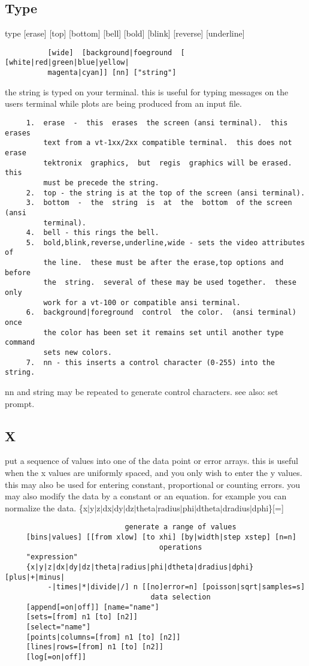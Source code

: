 \subsection{Type}
type  [erase]  [top] [bottom] [bell] [bold] [blink] [reverse] [underline]
\begin{verbatim}
          [wide]  [background|foeground  [  [white|red|green|blue|yellow|
          magenta|cyan]] [nn] ["string"] 
\end{verbatim}
the string is typed on your terminal.  this is useful for typing messages
on the users terminal while plots are being produced from an input file. 
\begin{verbatim}
     1.  erase  -  this  erases  the screen (ansi terminal).  this erases
         text from a vt-1xx/2xx compatible terminal.  this does not erase
         tektronix  graphics,  but  regis  graphics will be erased.  this
         must be precede the string.  
     2.  top - the string is at the top of the screen (ansi terminal).  
     3.  bottom  -  the  string  is  at  the  bottom  of the screen (ansi
         terminal).  
     4.  bell - this rings the bell.  
     5.  bold,blink,reverse,underline,wide - sets the video attributes of
         the line.  these must be after the erase,top options and  before
         the  string.  several of these may be used together.  these only
         work for a vt-100 or compatible ansi terminal.  
     6.  background|foreground  control  the color.  (ansi terminal) once
         the color has been set it remains set until another type command
         sets new colors.  
     7.  nn - this inserts a control character (0-255) into the string.  
\end{verbatim}
nn  and string may be repeated to generate control characters.  see also:
set prompt.  
\subsection{X}
put  a  sequence  of  values  into one of the data point or error arrays.
this is useful when the x values are uniformly spaced, and you only  wish
to  enter  the  y  values.   this may also be used for entering constant,
proportional or counting errors.  you may  also  modify  the  data  by  a
constant or an equation.  for example you can normalize the data.  
\{x$|$y$|$z$|$dx$|$dy$|$dz$|$theta$|$radius$|$phi$|$dtheta$|$dradius$|$dphi\}[=] 
\begin{verbatim}
                            generate a range of values
     [bins|values] [[from xlow] [to xhi] [by|width|step xstep] [n=n] 
                                    operations
     "expression" 
     {x|y|z|dx|dy|dz|theta|radius|phi|dtheta|dradius|dphi} [plus|+|minus|
          -|times|*|divide|/] n [[no]error=n] [poisson|sqrt|samples=s] 
                                  data selection
     [append[=on|off]] [name="name"] 
     [sets=[from] n1 [to] [n2]] 
     [select="name"] 
     [points|columns=[from] n1 [to] [n2]] 
     [lines|rows=[from] n1 [to] [n2]] 
     [log[=on|off]] 
\end{verbatim}
